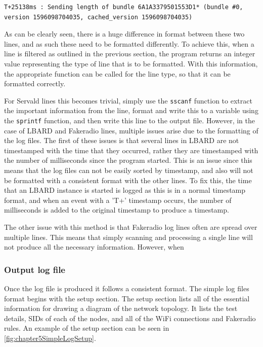 \begin{center}
    \begin{lstlisting}[breaklines]
T+25138ms : Sending length of bundle 6A1A3379501553D1* (bundle #0, version 1596098704035, cached_version 1596098704035)
    \end{lstlisting}
\end{center}


As can be clearly seen, there is a huge difference in format between these two lines, and as such these need to be formatted differently.
To achieve this, when a line is filtered as outlined in the previous section, the program returns an integer value representing the type of line that is to be formatted.
With this information, the appropriate function can be called for the line type, so that it can be formatted correctly.

For Servald lines this becomes trivial, simply use the \verb|sscanf| function to extract the important information from the line, format and write this to a variable using the \verb|sprintf| function, and then write this line to the output file. 
However, in the case of LBARD and Fakeradio lines, multiple issues arise due to the formatting of the log files.
The first of these issues is that several lines in LBARD are not timestamped with the time that they occurred, rather they are timestamped with the number of milliseconds since the program started.
This is an issue since this means that the log files can not be easily sorted by timestamp, and also will not be formatted with a consistent format with the other lines.
To fix this, the time that an LBARD instance is started is logged as this is in a normal timestamp format, and when an event with a 'T+' timestamp occurs, the number of milliseconds is added to the original timestamp to produce a timestamp. 

The other issue with this method is that Fakeradio log lines often are spread over multiple lines.
This means that simply scanning and processing a single line will not produce all the necessary information.
However, when 

\subsubsection{Output log file}

Once the log file is produced it follows a consistent format.
The simple log files format begins with the setup section.
The setup section lists all of the essential information for drawing a diagram of the network topology. 
It lists the test details, SIDs of each of the nodes, and all of the WiFi connections and Fakeradio rules. 
An example of the setup section can be seen in \figurename{ \ref{fig:chapter5SimpleLogSetup}}.

